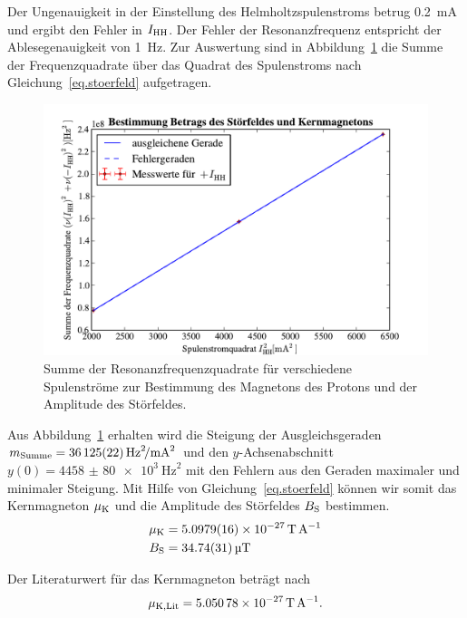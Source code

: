 \documentclass[paper=a4,
	fontsize=10pt,
	DIV=18,
	twocolumn,
	parskip=half
	]{scrartcl}
\numberwithin{equation}{section}    %
\begin{document}
Der Ungenauigkeit in der Einstellung des Helmholtzspulenstroms betrug \SI{0.2}{\milli\ampere} und ergibt den Fehler in $I_{\rm HH}$. Der Fehler der Resonanzfrequenz entspricht der Ablesegenauigkeit von \SI{1}{\hertz}.
Zur Auswertung sind in Abbildung~\ref{fig.stoerfeld} die Summe der Frequenzquadrate über das Quadrat des Spulenstroms nach Gleichung~\eqref{eq.stoerfeld} aufgetragen.

\begin{figure}[htp]
	\begin{center}
		\includegraphics[width=\columnwidth]{Data-Plots/10-helmholtz-summe.pdf}
		\caption{Summe der Resonanzfrequenzquadrate für verschiedene Spulenströme zur Bestimmung des Magnetons des Protons und der Amplitude des Störfeldes.}
		\label{fig.stoerfeld}
	\end{center}
\end{figure}

Aus Abbildung~\ref{fig.stoerfeld} erhalten wird die Steigung der Ausgleichsgeraden $m_{\rm Summe} = \SI[per-mode=symbol]{36125(22)}{\hertz\squared\per\milli\ampere\squared} $ und den $y$-Achsenabschnitt $y(0) = \SI{4458(80)e3}{\hertz\squared}$ mit den Fehlern aus den Geraden maximaler und minimaler Steigung.
Mit Hilfe von Gleichung~\eqref{eq.stoerfeld} können wir somit das Kernmagneton $\mu_{\rm K}$ und die Amplitude des Störfeldes $B_{\rm S}$ bestimmen.
\begin{align}
	\mu_{\rm K} &= \SI{5.0979(16)e-27}{\tesla\per\ampere}\\
	B_{\rm S} &=  \SI{34.74(31)}{\micro\tesla}
\end{align}

Der Literaturwert für das Kernmagneton beträgt nach~\citet{codata}
\begin{equation}
	\mu_{\rm K,Lit} = \SI{5.05078e-27}{\tesla\per\ampere}.
\end{equation}
\end{document}
